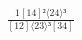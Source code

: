 \documentclass[varwidth, border=5pt]{standalone}
\begin{document}
\begin{my}
$\begin{gathered}
\scriptscriptstyle\frac{1[14]²⟨24⟩³}{[12]⟨23⟩³[34]}
\end{gathered}$
\end{my}
\end{document}
